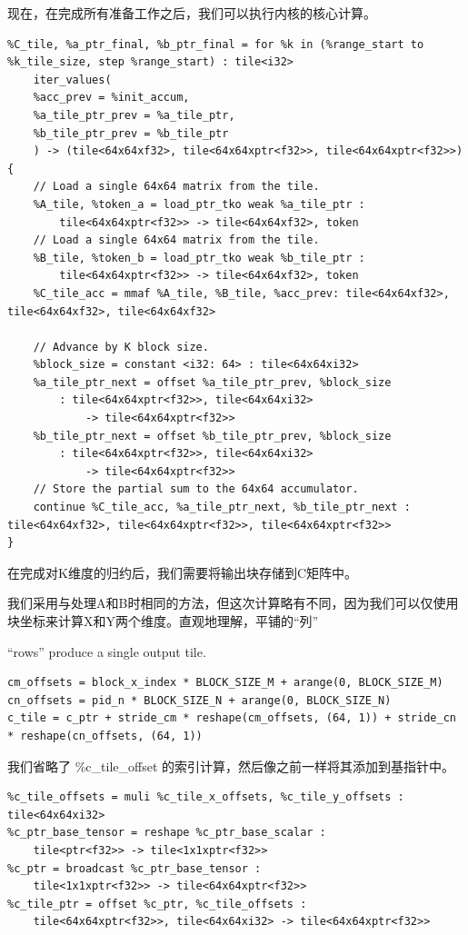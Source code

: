 \documentclass{article}
\begin{document}
现在，在完成所有准备工作之后，我们可以执行内核的核心计算。


\begin{lstlisting}
%C_tile, %a_ptr_final, %b_ptr_final = for %k in (%range_start to %k_tile_size, step %range_start) : tile<i32>
    iter_values(
    %acc_prev = %init_accum,
    %a_tile_ptr_prev = %a_tile_ptr,
    %b_tile_ptr_prev = %b_tile_ptr
    ) -> (tile<64x64xf32>, tile<64x64xptr<f32>>, tile<64x64xptr<f32>>)
{
    // Load a single 64x64 matrix from the tile.
    %A_tile, %token_a = load_ptr_tko weak %a_tile_ptr :
        tile<64x64xptr<f32>> -> tile<64x64xf32>, token
    // Load a single 64x64 matrix from the tile.
    %B_tile, %token_b = load_ptr_tko weak %b_tile_ptr :
        tile<64x64xptr<f32>> -> tile<64x64xf32>, token
    %C_tile_acc = mmaf %A_tile, %B_tile, %acc_prev: tile<64x64xf32>, tile<64x64xf32>, tile<64x64xf32>

    // Advance by K block size.
    %block_size = constant <i32: 64> : tile<64x64xi32>
    %a_tile_ptr_next = offset %a_tile_ptr_prev, %block_size
        : tile<64x64xptr<f32>>, tile<64x64xi32>
            -> tile<64x64xptr<f32>>
    %b_tile_ptr_next = offset %b_tile_ptr_prev, %block_size
        : tile<64x64xptr<f32>>, tile<64x64xi32>
            -> tile<64x64xptr<f32>>
    // Store the partial sum to the 64x64 accumulator.
    continue %C_tile_acc, %a_tile_ptr_next, %b_tile_ptr_next : tile<64x64xf32>, tile<64x64xptr<f32>>, tile<64x64xptr<f32>>
}
\end{lstlisting}

在完成对K维度的归约后，我们需要将输出块存储到C矩阵中。


我们采用与处理A和B时相同的方法，但这次计算略有不同，因为我们可以仅使用块坐标来计算X和Y两个维度。直观地理解，平铺的``列''

``rows'' produce a single output tile.


\begin{lstlisting}
cm_offsets = block_x_index * BLOCK_SIZE_M + arange(0, BLOCK_SIZE_M)
cn_offsets = pid_n * BLOCK_SIZE_N + arange(0, BLOCK_SIZE_N)
c_tile = c_ptr + stride_cm * reshape(cm_offsets, (64, 1)) + stride_cn * reshape(cn_offsets, (64, 1))
\end{lstlisting}

我们省略了 \%c\_tile\_offset 的索引计算，然后像之前一样将其添加到基指针中。


\begin{lstlisting}
%c_tile_offsets = muli %c_tile_x_offsets, %c_tile_y_offsets : tile<64x64xi32>
%c_ptr_base_tensor = reshape %c_ptr_base_scalar :
    tile<ptr<f32>> -> tile<1x1xptr<f32>>
%c_ptr = broadcast %c_ptr_base_tensor :
    tile<1x1xptr<f32>> -> tile<64x64xptr<f32>>
%c_tile_ptr = offset %c_ptr, %c_tile_offsets :
    tile<64x64xptr<f32>>, tile<64x64xi32> -> tile<64x64xptr<f32>>
\end{lstlisting}
\end{document}
